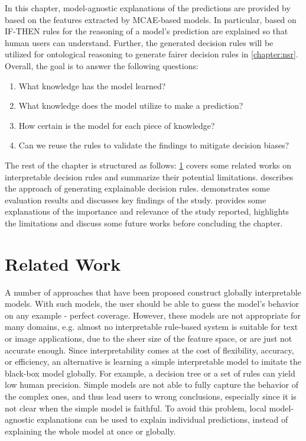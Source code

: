 \hspace*{3.5mm} In this chapter, model-agnostic explanations of the predictions are provided by based on the features extracted by MCAE-based models. In particular, based on IF-THEN rules for the reasoning of a model's prediction are explained so that human users can understand. Further, the generated decision rules will be utilized for ontological reasoning to generate fairer decision rules in \cref{chapter:nsr}. Overall, the goal is to answer the following questions: 

\begin{enumerate}[noitemsep]
    \item What knowledge has the model learned?
    \item What knowledge does the model utilize to make a prediction?
    \item How certain is the model for each piece of knowledge? 
    \item Can we reuse the rules to validate the findings to mitigate decision biases? 
\end{enumerate}

\hspace*{3.5mm} The rest of the chapter is structured as follows: \cref{chapter_7:rw} covers some related works on interpretable decision rules and summarize their potential limitations.  describes the approach of generating explainable decision rules.  demonstrates some evaluation results and discusses key findings of the study.  provides some explanations of the importance and relevance of the study reported, highlights the limitations and discuss some future works before concluding the chapter.  

\section{Related Work} \label{chapter_7:rw}
A number of approaches that have been proposed construct globally interpretable models. With such models, the user should be able to guess the model’s behavior on any example - perfect coverage. However, these models are not appropriate for many domains, e.g. almost no interpretable rule-based system is suitable for text or image applications, due to the sheer size of the feature space, or are just not accurate enough. 
Since interpretability comes at the cost of flexibility, accuracy, or efficiency, an alternative is learning a simple interpretable model to imitate the black-box model globally. For example, a decision tree or a set of rules can yield low human precision. Simple models are not able to fully capture the behavior of the complex ones, and thus lead users to wrong conclusions, especially since it is not clear when the simple model is faithful. To avoid this problem, local model-agnostic explanations can be used to explain individual predictions, instead of explaining the whole model at once or globally. 

